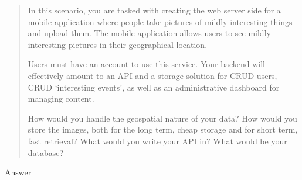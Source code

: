 \documentclass[12pt, letterpaper]{homework}
\begin{document}
\begin{quote}
    In this scenario, you are tasked with creating the web server side for a mobile
    application where people take pictures of mildly interesting things and upload
    them. The mobile application allows users to see mildly interesting pictures in
    their geographical location.

    Users must have an account to use this service. Your backend will effectively
    amount to an API and a storage solution for CRUD users, CRUD `interesting
    events', as well as an administrative dashboard for managing content.

    How would you handle the geospatial nature of your data? How would you store the
    images, both for the long term, cheap storage and for short term, fast
    retrieval? What would you write your API in? What would be your database?
\end{quote}

Answer %
\end{document}
